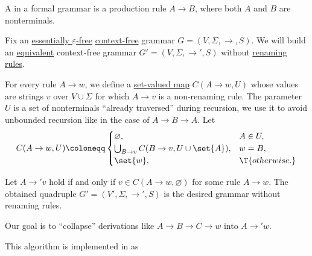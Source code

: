 \begin{definition}\label{def:renaming_rule}\mimprovised
  A  in a formal grammar is a production rule \( A \to B \), where both \( A \) and \( B \) are nonterminals.
\end{definition}

\begin{algorithm}\label{alg:renaming_rule_collapse}
  Fix an \hyperref[def:epsilon_free_grammar]{essentially \( \varepsilon \)-free} \hyperref[def:chomsky_hierarchy/context_free]{context-free} grammar \( G = (V, \Sigma, \to, S) \). We will build an \hyperref[def:formal_grammar/equivalent]{equivalent} context-free grammar \( G' = (V, \Sigma, \to', S) \) without \hyperref[def:renaming_rule]{renaming rules}.

  \begin{thmenum}
     For every rule \( A \to w \), we define a \hyperref[def:function]{set-valued map} \( C(A \to w, U) \) whose values are strings \( v \) over \( V \cup \Sigma \) for which \( A \to v \) is a non-renaming rule. The parameter \( U \) is a set of nonterminals \enquote{already traversed} during recursion, we use it to avoid unbounded recursion like in the case of \( A \to B \to A \). Let
    \begin{equation*}
      C(A \to w, U) \coloneqq \begin{cases}
        \varnothing,                                    &A \in U, \\
        \bigcup_{B \to v} C(B \to v, U \cup \set{ A }), &w = B, \\
        \set{ w },                                      &\T{otherwise.}
      \end{cases}
    \end{equation*}

     Let \( A \to' v \) hold if and only if \( v \in C(A \to w, \varnothing) \) for some rule \( A \to w \). The obtained quadruple \( G' = (V', \Sigma, \to', S) \) is the desired grammar without renaming rules.
  \end{thmenum}
\end{algorithm}
\begin{comments}
  \item Our goal is to \enquote{collapse} derivations like \( A \to B \to C \to w \) into \( A \to' w \).

  \item This algorithm is implemented in \cite{notebook:code} as
  \begin{CodeRefDisplay}
  \end{CodeRefDisplay}
\end{comments}


